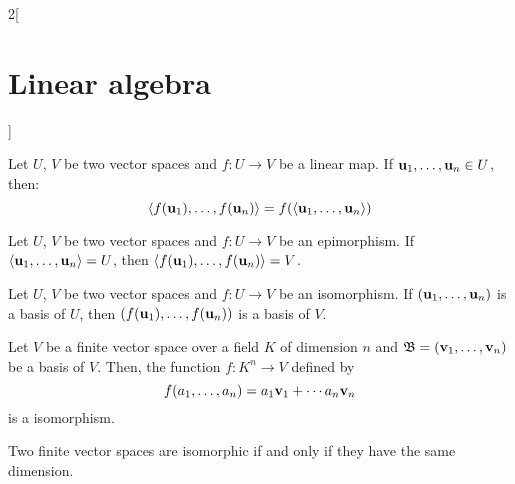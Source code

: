 \documentclass[../../../main.tex]{subfiles}
\begin{document}
\begin{multicols}{2}[\section{Linear algebra}]
\begin{prop}
  \end{prop}
  \begin{lemma}
    Let $U$, $V$ be two vector spaces and $f:U\rightarrow V$ be a linear map. If $\vb{u}_1,\ldots,\vb{u}_n\in U$, then: $$\langle f(\vb{u}_1),\ldots,f(\vb{u}_n)\rangle=f(\langle\vb{u}_1,\ldots,\vb{u}_n\rangle)$$
  \end{lemma}
  \begin{corollary}
    Let $U$, $V$ be two vector spaces and $f:U\rightarrow V$ be an epimorphism. If $\langle\vb{u}_1,\ldots,\vb{u}_n\rangle= U$, then $\langle f(\vb{u}_1),\ldots,f(\vb{u}_n)\rangle=V$.
  \end{corollary}
  \begin{corollary}
    Let $U$, $V$ be two vector spaces and $f:U\rightarrow V$ be an isomorphism. If $(\vb{u}_1,\ldots,\vb{u}_n)$ is a basis of $U$, then $(f(\vb{u}_1),\ldots,f(\vb{u}_n))$ is a basis of $V$.
  \end{corollary}
  \begin{theorem}
    Let $V$ be a finite vector space over a field $K$ of dimension $n$ and $\mathfrak{B}=(\vb{v}_1,\ldots,\vb{v}_n)$ be a basis of $V$. Then, the function $f:K^n\rightarrow V$ defined by $$f(a_1,\ldots,a_n)=a_1\vb{v}_1+\cdots a_n\vb{v}_n$$ is a isomorphism.
  \end{theorem}
  \begin{corollary}
    Two finite vector spaces are isomorphic if and only if they have the same dimension.
  \end{corollary}

\end{multicols}
\end{document}
